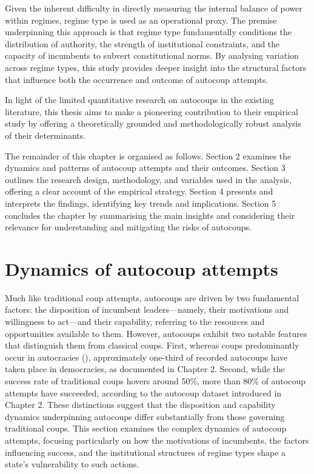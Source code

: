 \documentclass[
  12pt,
]{report}
\begin{document}
Given the inherent difficulty in directly measuring the internal balance
of power within regimes, regime type is used as an operational proxy.
The premise underpinning this approach is that regime type fundamentally
conditions the distribution of authority, the strength of institutional
constraints, and the capacity of incumbents to subvert constitutional
norms. By analysing variation across regime types, this study provides
deeper insight into the structural factors that influence both the
occurrence and outcome of autocoup attempts.

In light of the limited quantitative research on autocoups in the
existing literature, this thesis aims to make a pioneering contribution
to their empirical study by offering a theoretically grounded and
methodologically robust analysis of their determinants.

The remainder of this chapter is organised as follows. Section 2
examines the dynamics and patterns of autocoup attempts and their
outcomes. Section 3 outlines the research design, methodology, and
variables used in the analysis, offering a clear account of the
empirical strategy. Section 4 presents and interprets the findings,
identifying key trends and implications. Section 5 concludes the chapter
by summarising the main insights and considering their relevance for
understanding and mitigating the risks of autocoups.

\section{Dynamics of autocoup
attempts}\label{dynamics-of-autocoup-attempts}

Much like traditional coup attempts, autocoups are driven by two
fundamental factors: the disposition of incumbent leaders---namely,
their motivations and willingness to act---and their capability,
referring to the resources and opportunities available to them. However,
autocoups exhibit two notable features that distinguish them from
classical coups. First, whereas coups predominantly occur in autocracies
(), approximately
one-third of recorded autocoups have taken place in democracies, as
documented in Chapter 2. Second, while the success rate of traditional
coups hovers around 50\%, more than 80\% of autocoup attempts have
succeeded, according to the autocoup dataset introduced in Chapter 2.
These distinctions suggest that the disposition and capability dynamics
underpinning autocoups differ substantially from those governing
traditional coups. This section examines the complex dynamics of
autocoup attempts, focusing particularly on how the motivations of
incumbents, the factors influencing success, and the institutional
structures of regime types shape a state's vulnerability to such
actions.
\end{document}
